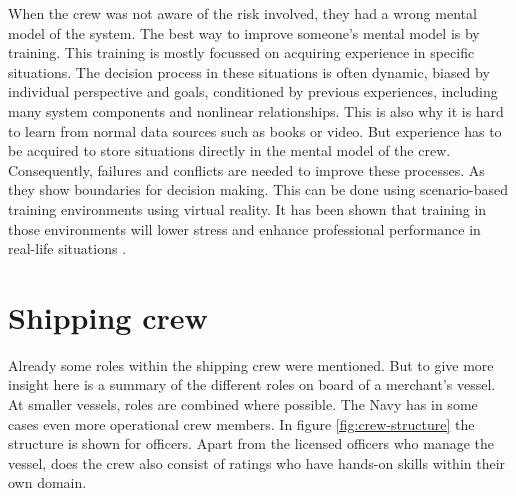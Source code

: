 When the crew was not aware of the risk involved, they had a wrong mental model of the system. The best way to improve someone's mental model is by training. This training is mostly focussed on acquiring experience in specific situations. The decision process in these situations is often dynamic, biased by individual perspective and goals, conditioned by previous experiences, including many system components and nonlinear relationships. This is also why it is hard to learn from normal data sources such as books or video. But experience has to be acquired to store situations directly in the mental model of the crew. Consequently, failures and conflicts are needed to improve these processes. As they show boundaries for decision making. This can be done using scenario-based training environments using virtual reality. It has been shown that training in those environments will lower stress and enhance professional performance in real-life situations \cite{Ford1998} \cite{Cohen2016}.

\newpage
\section{Shipping crew}	
Already some roles within the shipping crew were mentioned. But to give more insight here is a summary of the different roles on board of a merchant's vessel. At smaller vessels, roles are combined where possible. The Navy has in some cases even more operational crew members. In figure \ref{fig:crew-structure} the structure is shown for officers. Apart from the licensed officers who manage the vessel, does the crew also consist of ratings who have hands-on skills within their own domain. \cite{Nedcon2013}

